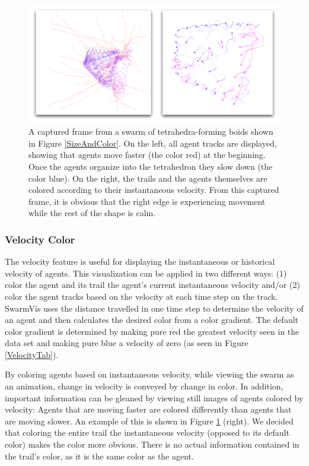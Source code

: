 \documentclass[conference]{IEEEtran}
\begin{document}
\begin{figure}
\centering
\includegraphics[scale=.666667]{images/velocity.pdf}
\caption{
A captured frame from a swarm of tetrahedra-forming boids shown in Figure \ref{SizeAndColor}.
On the left, all agent tracks are displayed, showing that agents move faster (the color red) at the beginning.
Once the agents organize into the tetrahedron they slow down (the color blue).
On the right, the trails and the agents themselves are colored according to their instantaneous velocity.
From this captured frame, it is obvious that the right edge is experiencing movement while the rest of the
shape is calm. }
\label{Velocity}
\end{figure}

\subsubsection{Velocity Color}

The velocity feature is useful for displaying the instantaneous or historical velocity of agents.
This visualization can be applied in two different ways: (1) color the agent and its trail the agent's current instantaneous
velocity and/or (2) color the agent tracks based on the velocity at each time step on the track.
SwarmVis uses the distance travelled in one time step to determine the velocity of an agent and then calculates the 
desired color from a color gradient.
The default color gradient is determined by making pure red the greatest velocity seen in the data set and making pure blue
a velocity of zero (as seen in Figure \ref{VelocityTab}).

By coloring agents based on instantaneous velocity, while viewing the swarm as an animation,
change in velocity is conveyed by change in color.
In addition, important information can be gleaned by viewing still images of agents colored by velocity:
Agents that are moving faster are colored differently than agents that are moving slower.
An example of this is shown in Figure \ref{Velocity} (right).
We decided that coloring the entire trail the instantaneous velocity (opposed to its default color)
makes the color more obvious.
There is no actual information contained in the trail's color, as it is the same color as the agent.
\end{document}
